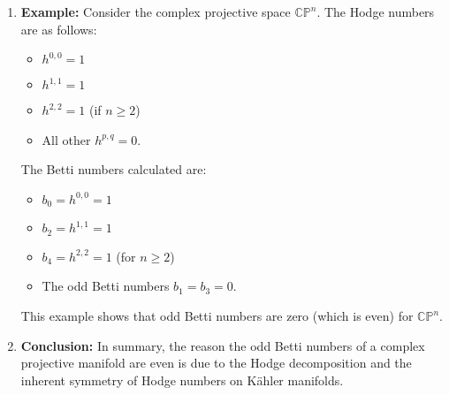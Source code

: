 \documentclass[lang=en,12pt]{beautybook}
\begin{document}
\begin{enumerate}
\item \textbf{Example:}
Consider the complex projective space $\mathbb{CP}^n$. The Hodge numbers are as follows:
\begin{itemize}
    \item $h^{0,0} = 1$
    \item $h^{1,1} = 1$
    \item $h^{2,2} = 1$ (if $n \geq 2$)
    \item All other $h^{p,q} = 0$.
\end{itemize}

The Betti numbers calculated are:
\begin{itemize}
    \item $b_0 = h^{0,0} = 1$
    \item $b_2 = h^{1,1} = 1$
    \item $b_4 = h^{2,2} = 1$ (for $n \geq 2$)
    \item The odd Betti numbers $b_1 = b_3 = 0$.
\end{itemize}

This example shows that odd Betti numbers are zero (which is even) for $\mathbb{CP}^n$.

\item \textbf{Conclusion:}
In summary, the reason the odd Betti numbers of a complex projective manifold are even is due to the Hodge decomposition and the inherent symmetry of Hodge numbers on Kähler manifolds.
\end{enumerate}
\end{document}
